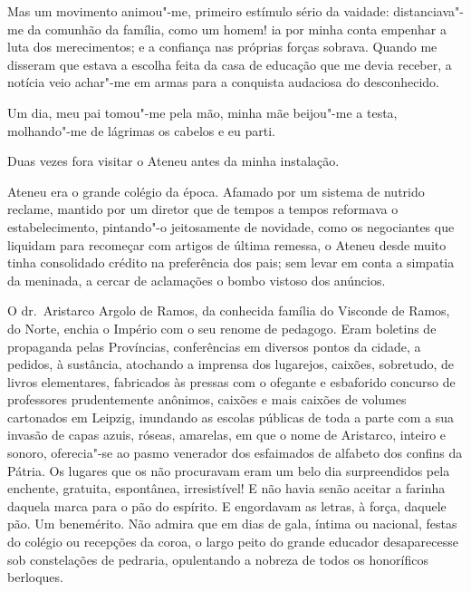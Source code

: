 Mas um movimento animou"-me, primeiro estímulo sério da vaidade: 
distanciava"-me da comunhão da família, como um homem! ia por minha conta 
empenhar a luta dos merecimentos; e a confiança nas próprias forças sobrava. 
Quando me disseram que estava a escolha feita da casa de educação que me devia
receber, a notícia veio achar"-me em armas para a conquista audaciosa
do desconhecido. 

Um dia, meu pai tomou"-me pela mão, minha mãe
beijou"-me a testa, molhando"-me de lágrimas os cabelos e eu parti.

Duas vezes fora visitar o Ateneu antes da minha instalação. 

Ateneu era o grande colégio da época. Afamado por um sistema de nutrido reclame,
mantido por um diretor que de tempos a tempos reformava o
estabelecimento, pintando"-o jeitosamente de novidade, como os
negociantes que liquidam para recomeçar com artigos de última remessa,
o Ateneu desde muito tinha consolidado crédito na preferência dos pais;
sem levar em conta a simpatia da meninada, a cercar de aclamações o
bombo vistoso dos anúncios. 

O dr.~Aristarco Argolo de Ramos, da
conhecida família do Visconde de Ramos, do Norte, enchia o Império com
o seu renome de pedagogo. Eram boletins de propaganda pelas Províncias,
conferências em diversos pontos da cidade, a pedidos, à sustância,
atochando a imprensa dos lugarejos, caixões, sobretudo, de livros
elementares, fabricados às pressas com o ofegante e esbaforido concurso
de professores prudentemente anônimos, caixões e mais caixões de
volumes cartonados em Leipzig, inundando as escolas públicas de toda a
parte com a sua invasão de capas azuis, róseas, amarelas, em que o nome
de Aristarco, inteiro e sonoro, oferecia"-se ao pasmo venerador dos
esfaimados de alfabeto dos confins da Pátria. Os lugares que os não
procuravam eram um belo dia surpreendidos pela enchente, gratuita,
espontânea, irresistível! E não havia senão aceitar a farinha daquela
marca para o pão do espírito. E engordavam as letras, à força, daquele
pão. Um benemérito. Não admira que em dias de gala, íntima ou nacional,
festas do colégio ou recepções da coroa, o largo peito do grande
educador desaparecesse sob constelações de pedraria, opulentando a
nobreza de todos os honoríficos berloques. 

